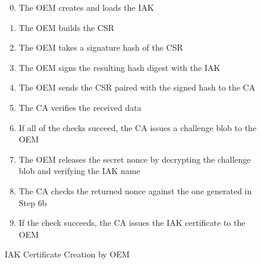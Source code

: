 \documentclass[runningheads]{llncs}
\begin{document}
\begin{figure}[hbtp]
\begin{enumerate}[itemsep=0pt,parsep=0pt,partopsep=0pt]
  \setcounter{enumi}{-1}
  \item The OEM creates and loads the IAK
  \item The OEM builds the CSR%
  \item The OEM takes a signature hash of the CSR
  \item The OEM signs the resulting hash digest with the IAK
  \item The OEM sends the CSR paired with the signed hash to the CA
  \item The CA verifies the received data%
  \item If all of the checks succeed, the CA issues a challenge blob to the OEM%
  \item The OEM releases the secret nonce by decrypting the challenge
    blob and verifying the IAK name
  \item The CA checks the returned nonce against the one generated in Step 6b
  \item If the check succeeds, the CA issues the IAK certificate to the OEM
  \end{enumerate}
  \caption{IAK Certificate Creation by OEM}
  \label{fig:iak-creation}
\end{figure}
\end{document}
